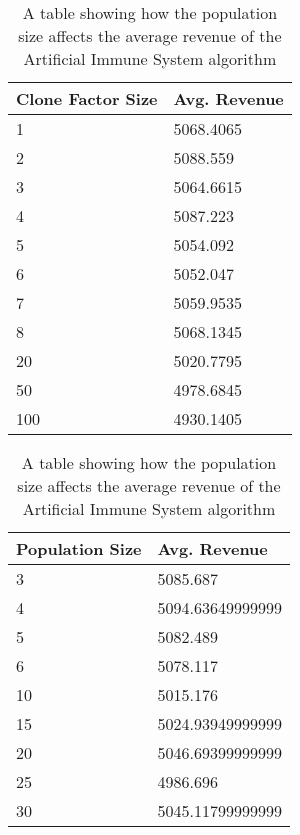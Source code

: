 \documentclass{article}
\begin{document}
\begin{table}[h]
\begin{minipage}[b]{0.45\linewidth}
\centering
\begin{tabular}{@{}ll@{}}
\toprule
Clone Factor Size & Avg. Revenue      \\ \midrule
1                 & 5068.4065         \\
2                 & 5088.559          \\
3                 & 5064.6615         \\
4                 & 5087.223          \\
5                 & 5054.092          \\
6                 & 5052.047          \\
7                 & 5059.9535         \\
8                 & 5068.1345         \\
20                & 5020.7795         \\
50                & 4978.6845         \\
100               & 4930.1405         \\ \bottomrule
\end{tabular}
\caption{A table showing how the clone factor size affects the average revenue of the Artificial Immune System algorithm}
\label{AIS-Clone-Factor-Size}
\end{minipage}
\hfill
\begin{minipage}[b]{0.45\linewidth}
\centering
\begin{tabular}{@{}ll@{}}
\toprule
Population Size & Avg. Revenue     \\ \midrule
3               & 5085.687         \\
4               & 5094.63649999999 \\
5               & 5082.489         \\
6               & 5078.117         \\
10              & 5015.176         \\
15              & 5024.93949999999 \\
20              & 5046.69399999999 \\
25              & 4986.696         \\
30              & 5045.11799999999 \\ \bottomrule
\end{tabular}
\caption{A table showing how the population size affects the average revenue of the Artificial Immune System algorithm}
\label{AIS-Population-Size}
\end{minipage}
\end{table}
\end{document}
